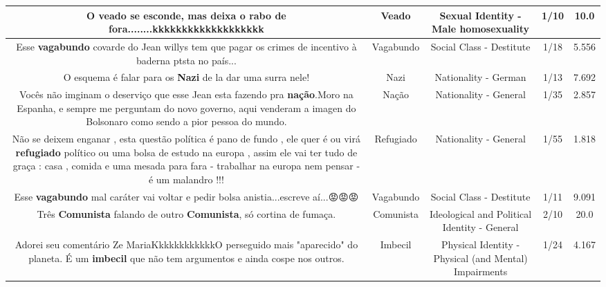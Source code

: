 \documentclass[11pt]{article}
\newlength\mylength
\begin{document}
\begin{center}
\begin{longtable}{|C{.65\mylength}|C{.30\mylength}|C{.12\mylength}|C{.12\mylength}|C{.12\mylength}|}
  \small O \textbf{veado} se esconde, mas deixa o rabo de fora........kkkkkkkkkkkkkkkkkkk\normalsize   & Veado & Sexual Identity - Male homosexuality & 1/10 & 10.0 \\  \hline
  \small Esse \textbf{vagabundo} covarde do Jean willys tem que pagar os crimes de incentivo à baderna ptsta no país...\normalsize   & Vagabundo & Social Class - Destitute & 1/18 & 5.556 \\  \hline
  \small O esquema é falar para os \textbf{Nazi} de la dar uma surra nele!\normalsize   & Nazi & Nationality - German & 1/13 & 7.692 \\  \hline
  \small Vocês não imginam o deserviço que esse Jean esta fazendo pra \textbf{nação}.Moro na Espanha, e sempre me perguntam do novo governo, aqui venderam a imagen do Bolsonaro como sendo a pior pessoa do mundo.\normalsize   & Nação & Nationality - General & 1/35 & 2.857 \\  \hline
  \small Não se deixem enganar , esta questão política é pano de fundo , ele quer é ou virá \textbf{refugiado} político ou uma bolsa de estudo na europa , assim ele vai ter tudo de graça : casa , comida e uma mesada para fara - trabalhar na europa nem pensar - é um malandro !!!\normalsize   & Refugiado & Nationality - General & 1/55 & 1.818 \\  \hline
  \small Esse \textbf{vagabundo} mal caráter vai voltar e pedir bolsa anistia...escreve aí...😡😡😡\normalsize   & Vagabundo & Social Class - Destitute & 1/11 & 9.091 \\  \hline
  \small Três  \textbf{Comunista} falando de outro  \textbf{Comunista}, só cortina de fumaça.\normalsize   & Comunista & Ideological and Political Identity - General & 2/10 & 20.0 \\  \hline
  \small Adorei seu comentário  Ze MariaKkkkkkkkkkkkO perseguido mais "aparecido" do planeta. É  um \textbf{imbecil} que não  tem argumentos e ainda  cospe nos outros.\normalsize   & Imbecil & Physical Identity - Physical (and Mental) Impairments & 1/24 & 4.167 \\  \hline

\end{longtable}
\end{center}
\end{document}
